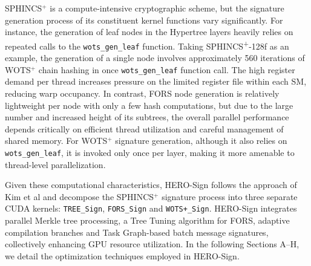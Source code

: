 \documentclass[10pt,conference]{IEEEtran}
\begin{document}
SPHINCS$^+$ is a compute-intensive cryptographic scheme, but the signature generation process of its constituent kernel functions vary significantly. For instance, the generation of leaf nodes in the Hypertree layers heavily relies on repeated calls to the \texttt{wots\_gen\_leaf} function. Taking SPHINCS\textsuperscript{+}-128f as an example, the generation of a single node involves approximately 560 iterations of WOTS$^+$ chain hashing in once \texttt{wots\_gen\_leaf} function call. 
The high register demand per thread increases pressure on the limited register file within each SM, reducing warp occupancy. In contrast, FORS node generation is relatively lightweight per node with only a few hash computations, but due to the large number and increased height of its subtrees, the overall parallel performance depends critically on efficient thread utilization and careful management of shared memory. For WOTS$^+$ signature generation, although it also relies on \texttt{wots\_gen\_leaf}, it is invoked only once per layer, making it more amenable to thread-level parallelization. 


Given these computational characteristics, HERO-Sign follows the approach of Kim et al \cite{kim2024parallel} and decompose the SPHINCS$^+$ signature process into three separate CUDA kernels: \texttt{TREE\_Sign}, \texttt{FORS\_Sign} and \texttt{WOTS+\_Sign}. HERO-Sign integrates parallel Merkle tree processing, a Tree Tuning algorithm for FORS, adaptive compilation branches and Task Graph-based batch message signatures, collectively enhancing GPU resource utilization. In the following Sections A–H, we detail the optimization techniques employed in HERO-Sign.


\end{document}
